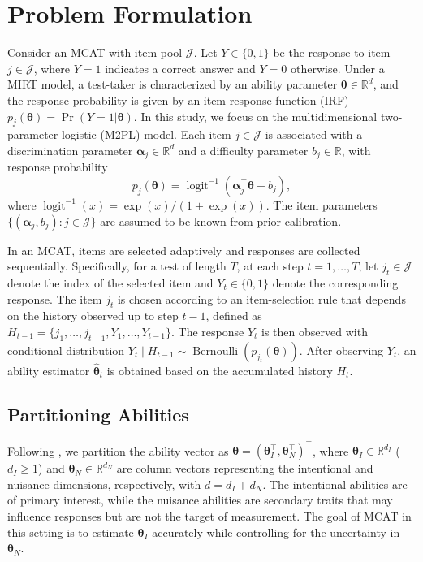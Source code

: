 \documentclass[12pt]{article}
\newcommand{\bftheta}{\boldsymbol{\theta}}
\begin{document}
\section{Problem Formulation}
\label{sec:problem}
Consider an MCAT with item pool $\mathcal{J}$. Let $Y \in \{0,1\}$ be the response to item $j \in \mathcal{J}$, where $Y=1$ indicates a correct answer and $Y=0$ otherwise. Under a MIRT model, a test-taker is characterized by an ability parameter $\bftheta \in \mathbb{R}^d$, and the response probability is given by an item response function (IRF) $p_j(\bftheta) = \Pr(Y=1|\bftheta)$.
In this study, we focus on the multidimensional two-parameter logistic (M2PL) model. Each item $j \in \mathcal{J}$ is associated with a discrimination parameter $\boldsymbol{\alpha}_j \in \mathbb{R}^d$ and a difficulty parameter $b_j \in \mathbb{R}$, with response probability
\begin{equation} \label{eq:model}
p_j(\bftheta) = \operatorname{logit}^{-1}(\boldsymbol{\alpha}_j^\top\bftheta - b_j),
\end{equation}
where $\operatorname{logit}^{-1}(x) = \exp(x)/(1+\exp(x))$. The item parameters $\{(\boldsymbol{\alpha}_j, b_j): j \in \mathcal{J}\}$ are assumed to be known from prior calibration.

In an MCAT, items are selected adaptively and responses are collected sequentially. Specifically, for a test of length $T$, at each step $t=1, \ldots, T$, let $j_t \in \mathcal{J}$ denote the index of the selected item and $Y_t \in \{0,1\}$ denote the corresponding response. The item $j_t$ is chosen according to an item-selection rule that depends on the history observed up to step $t-1$, defined as $H_{t-1} = \{j_1, \ldots, j_{t-1}, Y_1, \ldots, Y_{t-1}\}$. The response $Y_t$ is then observed with conditional distribution $Y_{t} \mid H_{t-1} \sim \operatorname{Bernoulli}(p_{j_t}(\bftheta))$. After observing $Y_{t}$, an ability estimator $\widehat{\bftheta}_t$ is obtained based on the accumulated history $H_t$.

\subsection{Partitioning Abilities}

Following , we partition the ability vector as $\bftheta = (\bftheta_I^\top, \bftheta_N^\top)^\top$, where $\bftheta_I \in \mathbb{R}^{d_I}$ ($d_I \ge 1$) and $\bftheta_N \in \mathbb{R}^{d_N}$ are column vectors representing the intentional and nuisance dimensions, respectively, with $d = d_I + d_N$. The intentional abilities are of primary interest, while the nuisance abilities are secondary traits that may influence responses but are not the target of measurement. The goal of MCAT in this setting is to estimate $\bftheta_I$ accurately while controlling for the uncertainty in $\bftheta_N$.
\end{document}
